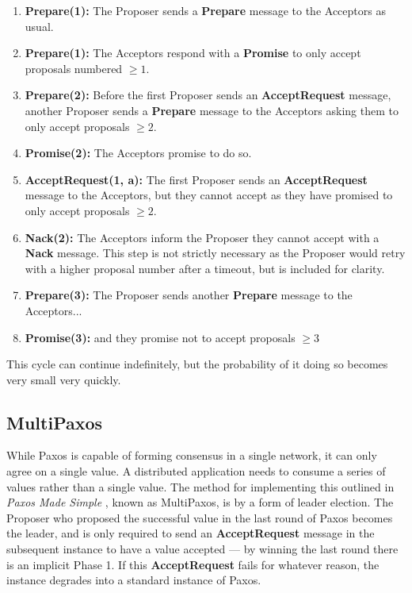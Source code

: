 \documentclass[12pt,twoside,notitlepage]{report}
\newcommand{\msg}[1] {{\bf #1}}         %
\begin{document}
\begin{enumerate}
\item \msg{Prepare(1):} The Proposer sends a \msg{Prepare} message to the Acceptors as usual.
\item \msg{Prepare(1):} The Acceptors respond with a \msg{Promise} to only accept proposals
	numbered $\ge 1$.
\item \msg{Prepare(2):} Before the first Proposer sends an \msg{AcceptRequest} message, another
	Proposer sends a \msg{Prepare} message to the Acceptors asking them to only accept
	proposals $\ge 2$.
\item \msg{Promise(2):} The Acceptors promise to do so.
\item \msg{AcceptRequest(1, a):} The first Proposer sends an \msg{AcceptRequest} message to the
	Acceptors, but they cannot accept as they have promised to only accept proposals $\ge 2$.
\item \msg{Nack(2):} The Acceptors inform the Proposer they cannot accept with a \msg{Nack}
	message. This step is not strictly necessary as the Proposer would retry with a higher
	proposal number after a timeout, but is included for clarity.
\item \msg{Prepare(3):} The Proposer sends another \msg{Prepare} message to the Acceptors...
\item \msg{Promise(3):} and they promise not to accept proposals $\ge 3$
\end{enumerate}

This cycle can continue indefinitely, but the probability of it doing so becomes very small very
quickly.

\subsection{MultiPaxos}

While Paxos is capable of forming consensus in a single network, it can only agree on a single
value. A distributed application needs to consume a series of values rather than a single value.
The method for implementing this outlined in \emph{Paxos Made Simple} \cite{lamport01}, known
as MultiPaxos, is by a form of leader election. The Proposer who proposed the successful value in
the last round of Paxos becomes the leader, and is only required to send an \msg{AcceptRequest}
message in the subsequent instance to have a value accepted --- by winning the last round there is
an implicit Phase 1. If this \msg{AcceptRequest} fails for whatever reason, the instance degrades
into a standard instance of Paxos.
\end{document}
